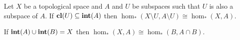 \begin{theorem}[Excision]\label{thm:excision}
    Let $X$ be a topological space and $A$ and $U$ be subspaces such that $U$ is also a subspace of $A$.
    If $\mathbf{cl}(U)\subseteq \mathbf{int}(A)$ then $\hom_*(X\setminus U, A\setminus U)\cong \hom_*(X, A)$.
\end{theorem}

\begin{corollary}
    If $\mathbf{int}(A)\cup \mathbf{int}(B) = X$ then $\hom_*(X, A)\cong \hom_*(B, A\cap B)$.
\end{corollary}

